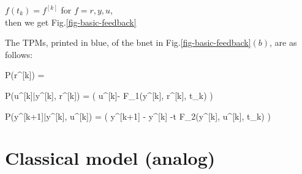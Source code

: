 $f(t_k)=f^{[k]}$ for $f=r,y,u$,
\\then we get 
Fig.\ref{fig-basic-feedback}

The TPMs, 
printed in blue,
of the bnet
in Fig.\ref{fig-basic-feedback}$(b)$,
are as follows:

\beq \color{blue}
P(r^{[k]}) = 
\eeq

\beq\color{blue}
P(u^{[k]}|y^{[k]}, r^{[k]}) = 
\delta(\quad
u^{[k]}- F_1(y^{[k]}, r^{[k]}, t_k)
\quad)
\eeq


\beq\color{blue}
P(y^{[k+1]}|y^{[k]}, u^{[k]})
=
\delta(\quad
y^{[k+1]}
- y^{[k]} -\Delta t F_2(y^{[k]}, u^{[k]}, t_k)
\quad)
\eeq




\section{Classical model (analog)}


